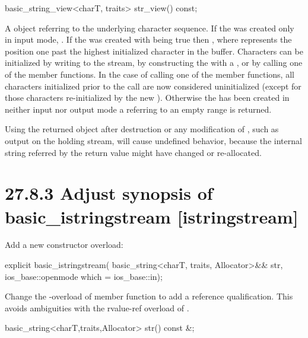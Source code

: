 \documentclass[ebook,11pt,article]{memoir}
\begin{document}
\begin{itemdecl}
basic_string_view<charT, traits> str_view() const;
\end{itemdecl}
\begin{itemdescr}
\pnum
\returns A  object referring to the  underlying character sequence. If the  was created only in input mode,  . If the  was created with  being true then , where  represents the position one past the highest initialized character in the buffer. Characters can be initialized by writing to the stream, by constructing the  with a , or by calling one of the  member functions. In the case of calling one of the  member functions, all characters initialized prior to the call are now considered uninitialized (except for those characters re-initialized by the new ). Otherwise the  has been created in neither input nor output mode a  referring to an empty range is returned. 

\pnum
\enternote
Using the returned object after destruction or any modification of , such as output on the holding stream, will cause undefined behavior, because the internal string referred by the return value might have changed or re-allocated. 
\exitnote
\end{itemdescr}
\section{27.8.3 Adjust synopsis of basic\_istringstream [istringstream]}
Add a new constructor overload:
\begin{codeblock}
           explicit basic_istringstream(
             basic_string<charT, traits, Allocator>&& str,
             ios_base::openmode which = ios_base::in);
\end{codeblock}

Change the -overload of  member function to add a reference qualification. This avoids ambiguities with the rvalue-ref overload of .  
\begin{codeblock}
basic_string<charT,traits,Allocator> str() const &;
\end{codeblock}
\end{document}
